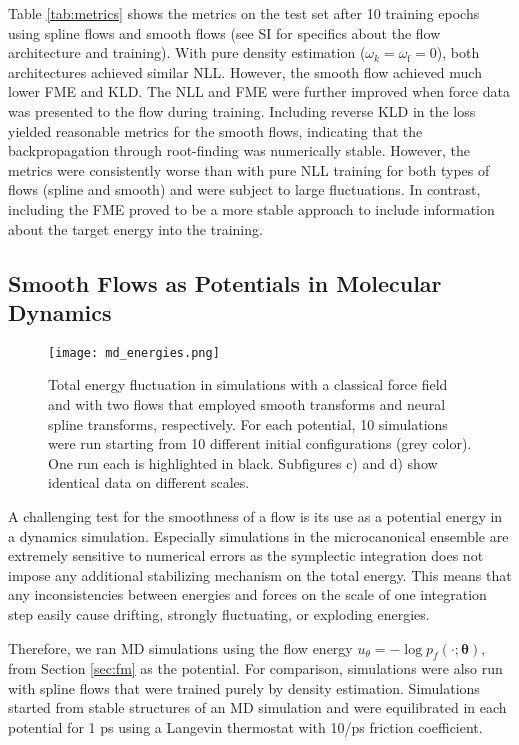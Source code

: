 \documentclass{article}
\begin{document}
Table \ref{tab:metrics} shows the metrics on the test set after 10 training epochs using spline flows and smooth flows (see SI for specifics about the flow architecture and training).
With pure density estimation ($\omega_k=\omega_{\mathrm{f}}=0$), both architectures achieved similar NLL. However, the smooth flow achieved much lower FME and KLD.
The NLL and FME were further improved when force data was presented to the flow during training. Including reverse KLD in the loss yielded reasonable metrics for the smooth flows, indicating that the backpropagation through root-finding was numerically stable. However, the metrics were consistently worse than with pure NLL training for both types of flows (spline and smooth) and were subject to large fluctuations. In contrast, including the FME proved to be a more stable approach to include information about the target energy into the training.

\subsection{Smooth Flows as Potentials in Molecular Dynamics}
\begin{figure}[htbp]
    \centering
    \texttt{[image: md\_energies.png]}
    \caption{Total energy fluctuation in simulations with a classical force field and with two flows that employed smooth transforms and neural spline transforms, respectively. For each potential, 10 simulations were run starting from 10 different initial configurations (grey color). One run each is highlighted in black. Subfigures c) and d) show identical data on different scales.}
    \label{fig:md_energies}
\end{figure}

A challenging test for the smoothness of a flow is its use as a potential energy in a dynamics simulation. Especially simulations in the microcanonical ensemble are extremely sensitive to numerical errors as the symplectic integration does not impose any additional stabilizing mechanism on the total energy. This means that any inconsistencies between energies and forces on the scale of one integration step easily cause drifting, strongly fluctuating, or exploding energies. 

Therefore, we ran MD simulations using the flow energy $u_\theta = -\log p_{f}(\cdot; \bm{\theta}),$ from Section \ref{sec:fm} as the potential. For comparison, simulations were also run with spline flows that were trained purely by density estimation. Simulations started from stable structures of an MD simulation and were equilibrated in each potential for 1 ps using a Langevin thermostat with 10/ps friction coefficient. 
\end{document}
